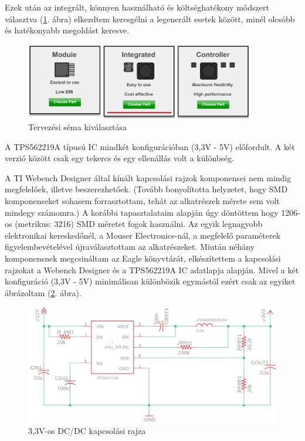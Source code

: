 \documentclass[../main.tex]{subfiles}
\begin{document}
            Ezek után az integrált, könnyen használható és költséghatékony módszert választva (\ref{fig:ti_we_des_int_etu_ce_method}. ábra) elkezdtem keresgélni a legenerált esetek között, minél olcsóbb és hatékonyabb megoldást keresve. %
            
            \begin{figure}[h!]
                \centering
                    \includegraphics[width=10cm]{resources/pcb_res/ti_we_des_int_etu_ce_method_2.png}
                \caption{Tervezési séma kiválasztása}
                \label{fig:ti_we_des_int_etu_ce_method}
            \end{figure}
            
            A TPS562219A típusú IC mindkét konfigurációban (3,3V - 5V) előfordult. A két verzió között %
            csak egy tekercs és egy ellenállás volt a különbség.
            
            A TI Webench Designer által kínált kapcsolási rajzok komponensei nem mindig megfelelőek, illetve beszerezhetőek. (Tovább bonyolította helyzetet, hogy SMD komponenseket sohasem forrasztottam, tehát az alkatrészek mérete sem volt mindegy számomra.) A korábbi tapasztalataim alapján úgy döntöttem hogy 1206-os (metrikus: 3216) SMD méretet fogok használni. Az egyik legnagyobb elektronikai kereskedőnél, a Mouser Electronics-nál, a megfelelő paraméterek figyelembevételével újraválasztottam az alkatrészeket. Miután néhány komponensnek megcsináltam az Eagle könyvtárát, elkészítettem a kapcsolási rajzokat a Webench Designer és a TPS562219A IC adatlapja alapján. Mivel a két konfiguráció (3,3V - 5V) minimálisan különbözik egymástól ezért csak az egyiket ábrázoltam (\ref{fig:schematic_3v3}. ábra).
            
            \begin{figure}[h!]
                \centering
                    \includegraphics[width=12cm]{resources/pcb_res/schematic_3v3.png}
                \caption{3,3V-os DC/DC kapcsolási rajza}
                \label{fig:schematic_3v3}
            \end{figure}
            
\end{document}
